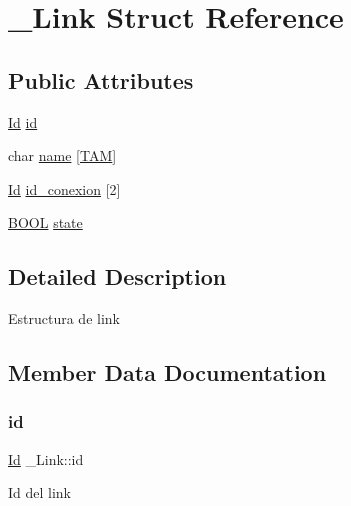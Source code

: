 \hypertarget{struct__Link}{}\section{\+\_\+\+Link Struct Reference}
\label{struct__Link}
\subsection*{Public Attributes}
\begin{DoxyCompactItemize}
\item 
\hyperlink{types_8h_a845e604fb28f7e3d97549da3448149d3}{Id} \hyperlink{struct__Link_a151212e7a8e8274c2a1ee991ba95878b}{id}
\item 
char \hyperlink{struct__Link_a5d81b67643f9c41056d8b199adbed77d}{name} \mbox{[}\hyperlink{types_8h_ae0b4816fb45161ef9da5e6d6134ee28a}{T\+AM}\mbox{]}
\item 
\hyperlink{types_8h_a845e604fb28f7e3d97549da3448149d3}{Id} \hyperlink{struct__Link_a9ea47d0c17026ae0e038fca89cd6fb7b}{id\+\_\+conexion} \mbox{[}2\mbox{]}
\item 
\hyperlink{types_8h_a3e5b8192e7d9ffaf3542f1210aec18dd}{B\+O\+OL} \hyperlink{struct__Link_a82cc94a1764a428c2eaaa6ef60fb3949}{state}
\end{DoxyCompactItemize}


\subsection{Detailed Description}
Estructura de link 

\subsection{Member Data Documentation}
\mbox{\label{struct__Link_a151212e7a8e8274c2a1ee991ba95878b}} 
\subsubsection{\texorpdfstring{id}{id}}
{\footnotesize\ttfamily \hyperlink{types_8h_a845e604fb28f7e3d97549da3448149d3}{Id} \+\_\+\+Link\+::id}

Id del link \mbox{\label{struct__Link_a9ea47d0c17026ae0e038fca89cd6fb7b}} 
